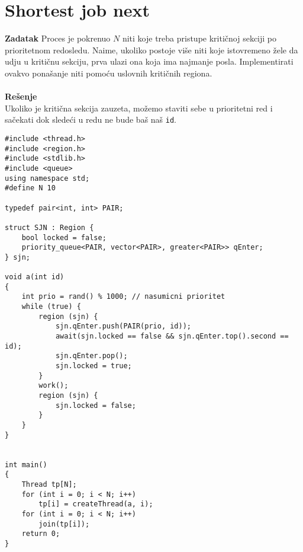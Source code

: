 \clearpage
\section{Shortest job next}
\textbf{\large Zadatak} Proces je pokrenuo $N$ niti koje treba pristupe kriti\v{c}noj sekciji po prioritetnom redosledu. Naime, ukoliko postoje vi\v{s}e niti koje istovremeno \v{z}ele da udju u kriti\v{c}nu sekciju, prva ulazi ona koja ima najmanje posla. Implementirati ovakvo pona\v{s}anje niti pomo\'{c}u uslovnih kriti\v{c}nih regiona.
\\\\
\textbf{\large Re\v{s}enje}\\
Ukoliko je kriti\v{c}na sekcija zauzeta, mo\v{z}emo staviti sebe u prioritetni red i sa\v{c}ekati dok slede\'{c}i u redu ne bude ba\v{s} na\v{s} \texttt{id}.
\begin{lstlisting}
#include <thread.h>
#include <region.h>
#include <stdlib.h>
#include <queue>
using namespace std;
#define N 10

typedef pair<int, int> PAIR;

struct SJN : Region {
    bool locked = false;
    priority_queue<PAIR, vector<PAIR>, greater<PAIR>> qEnter;
} sjn;

void a(int id) 
{
    int prio = rand() % 1000; // nasumicni prioritet
    while (true) {
        region (sjn) {
            sjn.qEnter.push(PAIR(prio, id));
            await(sjn.locked == false && sjn.qEnter.top().second == id);
            sjn.qEnter.pop();
            sjn.locked = true;
        }
        work();
        region (sjn) {
            sjn.locked = false;
        }
    }
}


int main() 
{
    Thread tp[N];
    for (int i = 0; i < N; i++) 
        tp[i] = createThread(a, i);
    for (int i = 0; i < N; i++) 
        join(tp[i]);
    return 0;
}

\end{lstlisting}